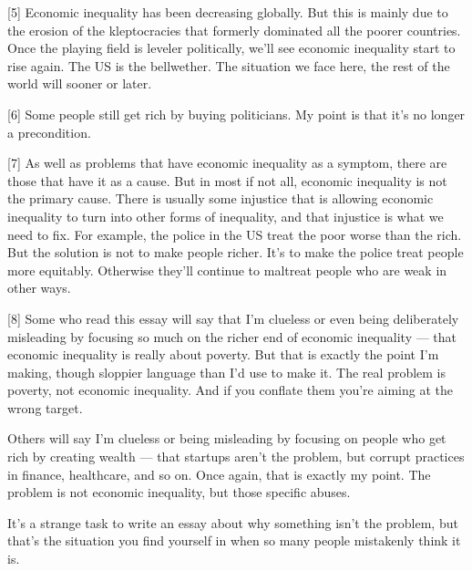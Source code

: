 [5] Economic inequality has been decreasing globally. But this
                  is mainly due to the erosion of the kleptocracies that
                  formerly dominated all the poorer countries. Once the playing
                  field is leveler politically, we'll see economic inequality
                  start to rise again. The US is the bellwether. The situation
                  we face here, the rest of the world will sooner or later.

[6] Some people still get rich by buying politicians. My point
                  is that it's no longer a precondition.

[7] As well as problems that have economic inequality as a
                  symptom, there are those that have it as a cause. But in most
                  if not all, economic inequality is not the primary cause.
                  There is usually some injustice that is allowing economic
                  inequality to turn into other forms of inequality, and that
                  injustice is what we need to fix. For example, the police in
                  the US treat the poor worse than the rich. But the solution is
                  not to make people richer. It's to make the police treat
                  people more equitably. Otherwise they'll continue to maltreat
                  people who are weak in other ways.

[8] Some who read this essay will say that I'm clueless or even
                  being deliberately misleading by focusing so much on the
                  richer end of economic inequality --- that economic
                  inequality is really about poverty. But that is exactly the
                  point I'm making, though sloppier language than I'd use to
                  make it. The real problem is poverty, not economic inequality.
                  And if you conflate them you're aiming at the wrong target.

Others
                  will say I'm clueless or being misleading by focusing on
                  people who get rich by creating wealth --- that startups
                  aren't the problem, but corrupt practices in finance,
                  healthcare, and so on. Once again, that is exactly my point.
                  The problem is not economic inequality, but those specific
                  abuses.

It's a strange task to write an essay about
                  why something isn't the problem, but that's the situation you
                  find yourself in when so many people mistakenly think it
                  is.

